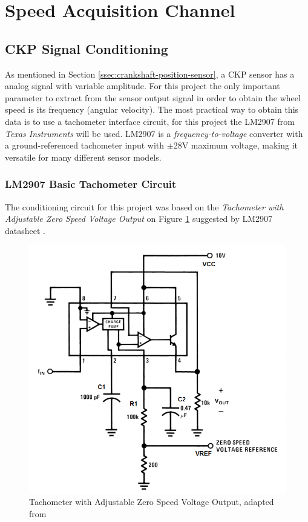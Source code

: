 \section{Speed Acquisition Channel}\label{sec:speed-acquisition-channel}

	\subsection{CKP Signal Conditioning}\label{ssec:ckp-signal-conditioning-circuit}

		As mentioned in Section \ref{ssec:crankshaft-position-sensor}, a CKP sensor has a analog signal with variable amplitude. For this project the only important parameter to extract from the sensor output signal in order to obtain the wheel speed is its frequency (angular velocity). The most practical way to obtain this data is to use a tachometer interface circuit, for this project the LM2907 from \textit{Texas Instruments} \cite{lm2907-datasheet} will be used. LM2907 is a \textit{frequency-to-voltage} converter with a ground-referenced tachometer input with $\pm$28V maximum voltage, making it versatile for many different sensor models.
		
		\subsubsection{LM2907 Basic Tachometer Circuit}\label{sssec:lm2907-basic-tachometer-circuit}
			The conditioning circuit for this project was based on the \textit{Tachometer with Adjustable Zero Speed Voltage Output} on Figure \ref{fig:lm2907-minimum-component-tachometer} suggested by LM2907 datasheet \cite{lm2907-datasheet}.

			\begin{figure}[htbp]
				\centering
					\includegraphics[scale=0.6]{figuras/fig-lm2907-minimum-component-tachometer.png}
				\caption{Tachometer with Adjustable Zero Speed Voltage Output, adapted from \cite{lm2907-minimum-component-tachometer}}
				\label{fig:lm2907-minimum-component-tachometer}
			\end{figure}

